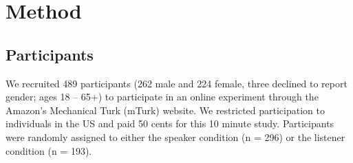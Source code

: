 \documentclass[man]{apa2}
\begin{document}





\section{Method}

\subsection{Participants} 

We recruited 489 participants (262 male and 224 female, three declined to report gender; ages 18 -- 65+) to participate in an online experiment through the Amazon's Mechanical Turk (mTurk) website.  We restricted participation to individuals in the US and paid 50 cents for this 10 minute study.  Participants were randomly assigned to either the speaker condition (n = 296) or the listener condition (n = 193).
\end{document}
